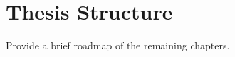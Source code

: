 \section{Thesis Structure}

\begin{outline}
  Provide a brief roadmap of the remaining chapters.
\end{outline}

